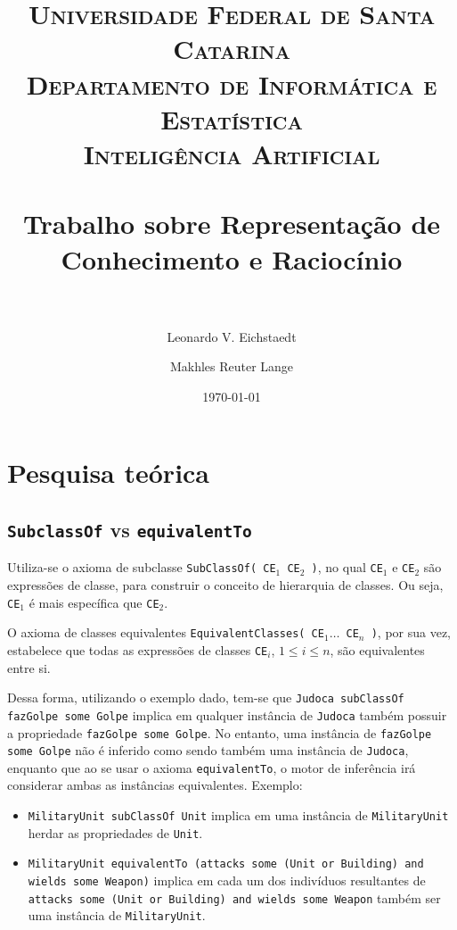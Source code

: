 \documentclass[10pt,a4paper]{article}
\title{
	\usefont{OT1}{bch}{b}{n}
	\normalfont \Large \textsc{Universidade Federal de Santa Catarina\\
		Departamento de Informática e Estatística\\
		Inteligência Artificial
	} \\ [25pt]
	\horrule{0.5pt} \\[0.4cm]
	\huge Trabalho sobre Representação de Conhecimento e Raciocínio \\
	\horrule{2pt} \\[0.5cm]
}
\author{Leonardo V. Eichstaedt\\
        \and
        Makhles Reuter Lange
}
\date{\today}
\begin{document}
\maketitle


\section{Pesquisa teórica}

\subsection{\texttt{SubclassOf} vs \texttt{equivalentTo}}

Utiliza-se o axioma de subclasse \texttt{SubClassOf( CE$_1$ CE$_2$ )}, no qual \texttt{CE$_1$} e \texttt{CE$_2$} são expressões de classe, para construir o conceito de hierarquia de classes. Ou seja, \texttt{CE$_1$} é mais específica que \texttt{CE$_2$}.

O axioma de classes equivalentes \texttt{EquivalentClasses( CE$_1 \ldots$ CE$_n$ )}, por sua vez, estabelece que todas as expressões de classes \texttt{CE$_i$}, $1 \leq i \leq n$, são equivalentes entre si.

Dessa forma, utilizando o exemplo dado, tem-se que \texttt{Judoca subClassOf fazGolpe some Golpe} implica em qualquer instância de \texttt{Judoca} também possuir a propriedade \texttt{fazGolpe some Golpe}. No entanto, uma instância de \texttt{fazGolpe some Golpe} não é inferido como sendo também uma instância de \texttt{Judoca}, enquanto que ao se usar o axioma \texttt{equivalentTo}, o motor de inferência irá considerar ambas as instâncias equivalentes. Exemplo:

\begin{itemize}

    \item \texttt{MilitaryUnit subClassOf Unit} implica em uma instância de \texttt{MilitaryUnit} herdar as propriedades de \texttt{Unit}.

    \item \texttt{MilitaryUnit equivalentTo (attacks some (Unit or Building) and wields some Weapon)} implica em cada um dos indivíduos resultantes de \texttt{attacks some (Unit or Building) and wields some Weapon} também ser uma instância de \texttt{MilitaryUnit}.

\end{itemize}
\end{document}
